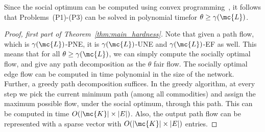 Since the social optimum can be computed using convex programming~\cite{roughgarden2002selfish}, it follows that %
Problems~(P1)-(P3) can be solved in polynomial time\footnotemark[6] for $\theta\ge\gamma(\mc{L})$.
\begin{proof}[Proof, first part of Theorem~\ref{thm:main_hardness}]
Note that given a path flow, which is $\gamma(\mc{L})$-PNE, it is $\gamma(\mc{L})$-UNE and $\gamma(\mc{L})$-EF as well.  This means that for all $\theta \geq \gamma(\mc{L})$, we can simply compute the socially optimal flow, and give any path decomposition as the $\theta$ fair flow. The socially optimal edge flow can be computed in time polynomial in the size of the network.  Further, a greedy path decomposition suffices. In the greedy algorithm, at every step we pick the current minimum path (among all commodities) and assign the maximum possible flow, under the social optimum, through this path. This can be computed in time $O(|\mc{K}|\times|E|)$.  Also, the output path flow can be represented with a sparse vector with $O(|\mc{K}|\times|E|)$ entries.
\end{proof}



